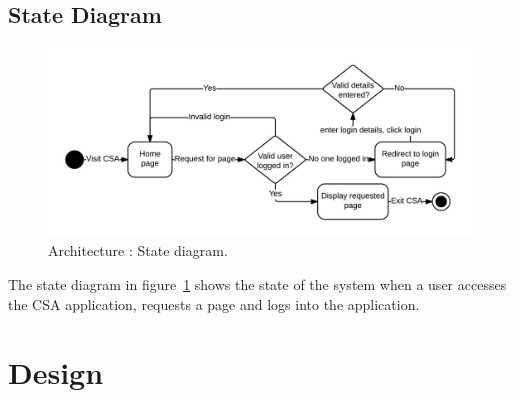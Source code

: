 \documentclass[10pt,a4paper,titlepage]{article}
\begin{document}
\subsection{State Diagram}
\begin{figure}[H]
\begin{center}
\includegraphics[scale=0.25]{include/State_Diagram.png}  
\caption{Architecture : State diagram. }
\label{fig:stateDiagram}
\end{center}
\end{figure}

The state diagram in figure~\ref{fig:stateDiagram} shows the state of the system when a user accesses the CSA application, requests a page and logs into the application. 

\section{Design}
\end{document}
